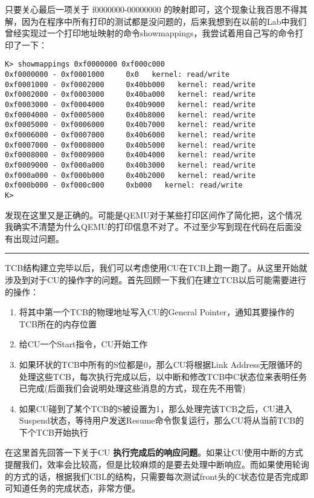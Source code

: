 \documentclass{article}
\newcommand{\highlight}[1]{{\bfseries \color{red}  #1}}
\begin{document}
\begin{CJK*}{UTF8}{gkai}
只要关心最后一项关于 f0000000-00000000 的映射即可，这个现象让我百思不得其解，因为在程序中所有打印的测试都是没问题的，后来我想到在以前的Lab中我们曾经实现过一个打印地址映射的命令showmappings，我尝试着用自己写的命令打印了一下：

\begin{lstlisting}[style=console]
K> showmappings 0xf0000000 0xf000c000
0xf0000000 - 0xf0001000     0x0   kernel: read/write
0xf0001000 - 0xf0002000     0x40bb000   kernel: read/write
0xf0002000 - 0xf0003000     0x40ba000   kernel: read/write
0xf0003000 - 0xf0004000     0x40b9000   kernel: read/write
0xf0004000 - 0xf0005000     0x40b8000   kernel: read/write
0xf0005000 - 0xf0006000     0x40b7000   kernel: read/write
0xf0006000 - 0xf0007000     0x40b6000   kernel: read/write
0xf0007000 - 0xf0008000     0x40b5000   kernel: read/write
0xf0008000 - 0xf0009000     0x40b4000   kernel: read/write
0xf0009000 - 0xf000a000     0x40b3000   kernel: read/write
0xf000a000 - 0xf000b000     0x40b2000   kernel: read/write
0xf000b000 - 0xf000c000     0xb000   kernel: read/write
K> 
\end{lstlisting}

发现在这里又是正确的。可能是QEMU对于某些打印区间作了简化把，这个情况我确实不清楚为什么QEMU的打印信息不对了。不过至少写到现在代码在后面没有出现过问题。

\vspace{2em}
\hrule
\vspace{2em}

TCB结构建立完毕以后，我们可以考虑使用CU在TCB上跑一跑了。从这里开始就涉及到对于CU的操作字的问题。首先回顾一下我们在建立TCB以后可能需要进行的操作：

\begin{enumerate}
\item{将其中第一个TCB的物理地址写入CU的General Pointer，通知其要操作的TCB所在的内存位置}
\item{给CU一个Start指令，CU开始工作}
\item{如果环状的TCB中所有的S位都是0，那么CU将根据Link Address无限循环的处理这些TCB，每次执行完成以后，以中断和修改TCB中C状态位来表明任务已完成(后面我们会说明处理这些消息的方式，现在先不用管)}
\item{如果CU碰到了某个TCB的S被设置为1，那么处理完该TCB之后，CU进入Suspend状态，等待用户发送Resume命令恢复运行，那么CU将从当前TCB的下个TCB开始执行}
\end{enumerate}

在这里首先回答一下关于CU\highlight{执行完成后的响应问题}。如果让CU使用中断的方式提醒我们，效率会比较高，但是比较麻烦的是要去处理中断响应。而如果使用轮询的方式的话，根据我们CBL的结构，只需要每次测试front头的C状态位是否完成即可知道任务的完成状态，非常方便。


\end{CJK*}
\end{document}
